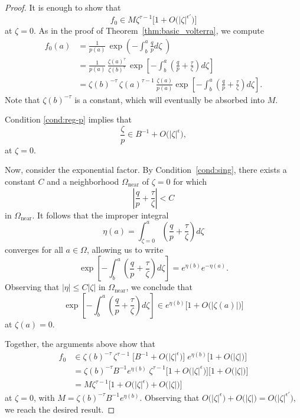 \documentclass[final]{siamart220329}
\newcommand{\solproto}{f_0}
\newcommand{\domain}{\Omega}
\newcommand{\near}{\Omega_\text{near}}
\begin{document}
\begin{proof}
It is enough to show that
\[ \solproto \in M\zeta^{\tau-1} \Big[1 + O\big(|\zeta|^{\epsilon'}\big)\Big] \]
at $\zeta = 0$. As in the proof of Theorem~\ref{thm:basic_volterra}, we compute
\begin{align*}
\solproto(a)&=\frac{1}{p(a)}\, \exp\left(-\int_b^a\frac{q}{p} d\zeta\;\right)\\
& = \frac{1}{p(a)}\,\frac{\zeta(a)^{\tau}}{\zeta(b)^{\tau}}\,\exp\left[-\int_b^a \left(\frac{q}{p}+\frac{\tau}{\zeta}\right) d\zeta\right]\\
& = \zeta(b)^{-\tau}\,\zeta(a)^{\tau-1}\,\frac{\zeta(a)}{p(a)} \exp\left[-\int_b^a\left(\frac{q}{p}+\frac{\tau}{\zeta}\right) d\zeta\right].
\end{align*}
Note that $\zeta(b)^{-\tau}$ is a constant, which will eventually be absorbed into $M$.

Condition \eqref{cond:reg-p} implies that
\[ \frac{\zeta}{p} \in B^{-1} + O\big(|\zeta|^{\epsilon}\big), \]
at $\zeta = 0$.

Now, consider the exponential factor. By Condition~\eqref{cond:sing}, there exists a constant $C$ and a neighborhood $\domain_\text{near}$ of $\zeta = 0$ for which
\[ \left| \frac{q}{p}+\frac{\tau}{\zeta} \right| < C \]
in $\domain_\text{near}$. It follows that the improper integral
\[ \eta(a) = \int_{\zeta = 0}^a \left(\frac{q}{p}+\frac{\tau}{\zeta}\right) d\zeta \]
converges for all $a \in \domain$, allowing us to write
\[ \exp\left[-\int_b^a\left(\frac{q}{p}+\frac{\tau}{\zeta}\right) d\zeta\right] = e^{\eta(b)} e^{-\eta(a)}. \]
Observing that $|\eta| \le C |\zeta|$ in $\near$, we conclude that
\[ \exp\left[-\int_b^a\left(\frac{q}{p}+\frac{\tau}{\zeta}\right) d\zeta\right] \in e^{\eta(b)} \Big[ 1 + O\big(|\zeta(a)|\big) \Big] \]
at $\zeta(a) = 0$.

Together, the arguments above show that
\begin{align*}
\solproto & \in \zeta(b)^{-\tau}\,\zeta^{\tau-1}\;\Big[ B^{-1} + O\big(|\zeta|^{\epsilon}\big) \Big]\;e^{\eta(b)} \Big[1 + O\big(|\zeta|\big) \Big] \\
& = \zeta(b)^{-\tau} B^{-1} e^{\eta(b)}\;\zeta^{\tau-1} \Big[ 1 + O\big(|\zeta|^{\epsilon}\big) \Big] \Big[1 + O\big(|\zeta|\big) \Big] \\
& = M\zeta^{\tau-1} \Big[ 1 + O\big(|\zeta|^{\epsilon}\big) + O\big(|\zeta|\big) \Big]
\end{align*}
at $\zeta = 0$, with $M = \zeta(b)^{-\tau} B^{-1} e^{\eta(b)}$. Observing that $O\big(|\zeta|^{\epsilon}\big) + O\big(|\zeta|\big) = O\big(|\zeta|^{\epsilon'}\big)$, we reach the desired result.
\end{proof}
\end{document}
